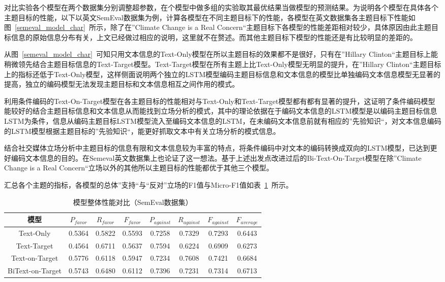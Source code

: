 对比实验各个模型在两个数据集分别调整超参数，在个模型中做多组的实验取其最优结果当做模型的预测结果。为说明各个模型在具体各个主题目标的性能，以下以英文SemEval数据集为例，计算各模型在不同主题目标下的性能，各模型在英文数据集各主题目标下性能如图~\ref{semeval_model_char}~所示，除了在”Climate Change is a Real Concern“主题目标下各模型的性能差距相对较少，具体原因由此主题目标信息的原始信息分布有关，上文已经做过相应的说明，这里就不在赘述。而其他主题目标下模型的性能还是有比较明显的差距的。

从图~\ref{semeval_model_char}~可知只用文本信息的Text-Only模型在所以主题目标的效果都不是很好，只有在”Hillary Clinton“主题目标上能稍微领先结合主题目标信息的Text-Target模型。Text-Target模型在所有主题上比Text-Only模型无明显的提升，在”Hillary Clinton“主题目标上的指标还低于Text-Only模型，这样侧面说明两个独立的LSTM模型编码主题目标信息和文本信息的模型比单独编码文本信息模型无显著的提高，独立的编码模型无法发现主题目标和文本信息相互之间作用的模式。

利用条件编码的Text-On-Target模型在各主题目标的性能相对与Text-Only和Text-Target模型都有都有显著的提升，这证明了条件编码模型能较好的结合主题目标信息和文本信息从而能找到立场分析的模式，其中的理论依据在于编码文本信息的LSTM模型是以编码主题目标信息LSTM为条件，信息从编码主题目标LSTM模型流入至编码文本信息的LSTM，在未编码文本信息前就有相应的”先验知识“，对文本信息编码的LSTM模型根据主题目标的”先验知识“，能更好抓取文本中有关立场分析的模式信息。

结合社交媒体立场分析中主题目标的信息有限和文本信息较为丰富的特点，将条件编码中对文本的编码转换成双向的LSTM模型，已达到更好编码文本信息的目的。在Semeval英文数据集上也论证了这一想法。基于上述出发点改进过后的Bi-Text-On-Target模型在除”Climate Change is a Real Concern“立场以外的其他所以主题目标的性能都优于其他三个模型。


汇总各个主题的指标，各模型的总体”支持“与“反对”立场的F1值与Micro-F1值如表~\ref{semeval_all_model}~所示。
\begin{table}[htbp]
	\caption[table123]{模型整体性能对比（SemEval数据集）}
	\label{semeval_all_model}
	\vspace{0.5em}\centering\wuhao
	\begin{tabular}{cccccccc}
		\toprule[1.5pt]
		模型& $P_{favor}$&$R_{favor}$&$F_{favor}$&$P_{against}$&$R_{against}$&$F_{against}$&$F_{average}$ \\
		\midrule[1pt]
		Text-Only&0.5364&0.5822&0.5593&0.7258&0.7329&0.7293&0.6443\\
		Text-Target&0.4564&0.6711&0.5637&0.7594&0.6224&0.6909&0.6273\\
		Text-on-Target&0.5776&0.6118&0.5947&0.7234&0.7608&0.7421&0.6684\\
		BiText-on-Target&0.5743&0.6480&0.6112&0.7396&0.7231&0.7314&0.6713\\
		\bottomrule[1.5pt]
	\end{tabular}
\end{table}


